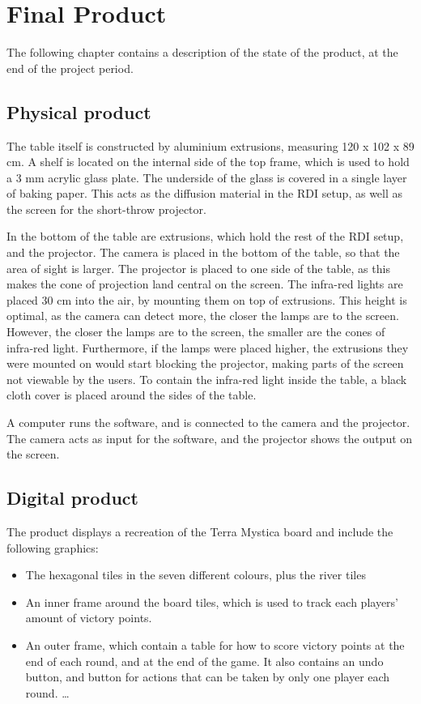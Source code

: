 \chapter{Final Product}\label{ch:finproduct}
The following chapter contains a description of the state of the product, at the end of the project period.

\section{Physical product}
The table itself is constructed by aluminium extrusions, measuring 120 x 102 x 89 cm. A shelf is located on the internal side of the top frame, which is used to hold a 3 mm acrylic glass plate. The underside of the glass is covered in a single layer of baking paper. This acts as the diffusion material in the RDI setup, as well as the screen for the short-throw projector.

In the bottom of the table are extrusions, which hold the rest of the RDI setup, and the projector. The camera is placed in the bottom of the table, so that the area of sight is larger. The projector is placed to one side of the table, as this makes the cone of projection land central on the screen. The infra-red lights are placed 30 cm into the air, by mounting them on top of extrusions. This height is optimal, as the camera can detect more, the closer the lamps are to the screen. However, the closer the lamps are to the screen, the smaller are the cones of infra-red light.  Furthermore, if the lamps were placed higher, the extrusions they were mounted on would start blocking the projector, making parts of the screen not viewable by the users. To contain the infra-red light inside the table, a black cloth cover is placed around the sides of the table.

A computer runs the software, and is connected to the camera and the projector. The camera acts as input for the software, and the projector shows the output on the screen.

\section{Digital product}
The product displays a recreation of the Terra Mystica board and include the following graphics:
\begin{itemize}
	\item The hexagonal tiles in the seven different colours, plus the river tiles
	\item An inner frame around the board tiles, which is used to track each players' amount of victory points.
	\item An outer frame, which contain a table for how to score victory points at the end of each round, and at the end of the game. It also contains an undo button, and button for actions that can be taken by only one player each round.
	\ldots
\end{itemize}


